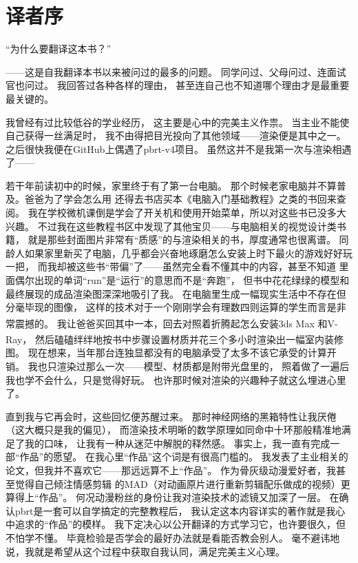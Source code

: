 \chapter{译者序}\label{chap:译者序}

“为什么要翻译这本书？”

——这是自我翻译本书以来被问过的最多的问题。
同学问过、父母问过、连面试官也问过。
我回答过各种各样的理由，
甚至连自己也不知道哪个理由才是最重要最关键的。

我曾经有过比较低谷的学业经历，
这主要是心中的完美主义作祟。
当主业不能使自己获得一丝满足时，
我不由得把目光投向了其他领域——渲染便是其中之一。
之后很快我便在GitHub上偶遇了pbrt-v4项目。
虽然这并不是我第一次与渲染相遇了——

若干年前读初中的时候，家里终于有了第一台电脑。
那个时候老家电脑并不算普及。爸爸为了学会怎么用
还得去书店买本《电脑入门基础教程》之类的书回来查阅。
我在学校微机课倒是学会了开关机和使用开始菜单，所以对这些书已没多大兴趣。
不过我在这些教程书区中发现了其他宝贝——与电脑相关的视觉设计类书籍，
就是那些封面图片非常有“质感”的与渲染相关的书，厚度通常也很离谱。
同龄人如果家里新买了电脑，几乎都会兴奋地琢磨怎么安装上时下最火的游戏好好玩一把，
而我却被这些书“带偏”了——虽然完全看不懂其中的内容，甚至不知道
里面偶尔出现的单词“run”是“运行”的意思而不是“奔跑”，
但书中花花绿绿的模型和最终展现的成品渲染图深深地吸引了我。
在电脑里生成一幅现实生活中不存在但分毫毕现的图像，
这样的技术对于一个刚刚学会有理数四则运算的学生而言是非常震撼的。
我让爸爸买回其中一本，回去对照着折腾起怎么安装3ds Max\textsuperscript{\textregistered}
和V-Ray\textsuperscript{\textregistered}，
然后磕磕绊绊地按书中步骤设置材质并花三个多小时渲染出一幅室内装修图。
现在想来，当年那台连独显都没有的电脑承受了太多不该它承受的计算开销。
我也只渲染过那么一次——模型、材质都是附带光盘里的，
照着做了一遍后我也学不会什么，只是觉得好玩。
也许那时候对渲染的兴趣种子就这么埋进心里了。

直到我与它再会时，这些回忆便苏醒过来。
那时神经网络的黑箱特性让我厌倦（这大概只是我的偏见），
而渲染技术明晰的数学原理如同命中十环那般精准地满足了我的口味，
让我有一种从迷茫中解脱的释然感。
事实上，我一直有完成一部“作品”的愿望。
在我心里“作品”这个词是有很高门槛的。
我发表了主业相关的论文，但我并不喜欢它——那远远算不上“作品”。
作为骨灰级动漫爱好者，我甚至觉得自己倾注情感剪辑
的MAD（对动画原片进行重新剪辑配乐做成的视频）更算得上“作品”。
何况动漫粉丝的身份让我对渲染技术的滤镜又加深了一层。
在确认pbrt是一套可以自学搞定的完整教程后，
我认定这本内容详实的著作就是我心中追求的“作品”的模样。
我下定决心以公开翻译的方式学习它，也许要很久，但不怕学不懂。
毕竟检验是否学会的最好办法就是看能否教会别人。
毫不避讳地说，我就是希望从这个过程中获取自我认同，满足完美主义心理。

